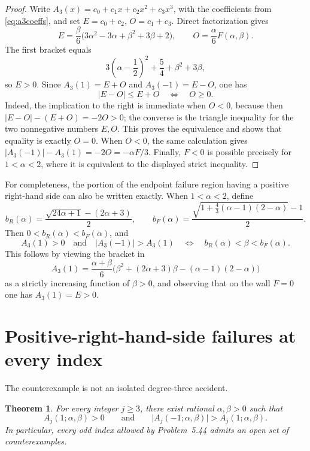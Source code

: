 \documentclass[a4paper]{amsart}
\newtheorem{theorem}{Theorem}[section]
\theoremstyle{remark}
\begin{document}
\begin{proof}
Write \(A_3(x)=c_0+c_1x+c_2x^2+c_3x^3\), with the coefficients from
\eqref{eq:a3coeffs}, and set \(E=c_0+c_2\), \(O=c_1+c_3\).  Direct factorization gives
\[
 E=\frac{\beta}{6}
 \bigl(3\alpha^2-3\alpha+\beta^2+3\beta+2\bigr),
 \qquad
 O=\frac{\alpha}{6}F(\alpha,\beta).
\]
The first bracket equals
\[
 3\left(\alpha-\frac12\right)^2+\frac54+\beta^2+3\beta,
\]
so \(E>0\).  Since \(A_3(1)=E+O\) and \(A_3(-1)=E-O\), one has
\[
 \lvert E-O\rvert\leq E+O \quad\Longleftrightarrow\quad O\geq0.
\]
Indeed, the implication to the right is immediate when \(O<0\), because then
\(\lvert E-O\rvert-(E+O)=-2O>0\); the converse is the triangle inequality for
the two nonnegative numbers \(E,O\).  This proves the equivalence and shows that equality is exactly \(O=0\).  When \(O<0\), the same calculation gives
\(\lvert A_3(-1)\rvert-A_3(1)=-2O=-\alpha F/3\).
Finally, \(F<0\) is possible precisely for \(1<\alpha<2\), where it is equivalent to the displayed strict inequality.
\end{proof}

For completeness, the portion of the endpoint failure region having a positive right-hand side can also be written exactly.  When \(1<\alpha<2\), define
\[
 b_R(\alpha)=\frac{\sqrt{24\alpha+1}-(2\alpha+3)}2,
 \qquad
 b_F(\alpha)=\frac{\sqrt{1+\frac43(\alpha-1)(2-\alpha)}-1}{2}.
\]
Then \(0<b_R(\alpha)<b_F(\alpha)\), and
\[
 A_3(1)>0\quad\text{and}\quad \lvert A_3(-1)\rvert>A_3(1)
 \quad\Longleftrightarrow\quad
 b_R(\alpha)<\beta<b_F(\alpha).
\]
This follows by viewing the bracket in
\[
 A_3(1)=\frac{\alpha+\beta}{6}
 \bigl(\beta^2+(2\alpha+3)\beta-(\alpha-1)(2-\alpha)\bigr)
\]
as a strictly increasing function of \(\beta>0\), and observing that on the wall \(F=0\) one has \(A_3(1)=E>0\).

\section{Positive-right-hand-side failures at every index}

The counterexample is not an isolated degree-three accident.

\begin{theorem}\label{thm:everyindex}
For every integer \(j\geq3\), there exist rational \(\alpha,\beta>0\) such that
\[
 A_j(1;\alpha,\beta)>0
 \qquad\text{and}\qquad
 \lvert A_j(-1;\alpha,\beta)\rvert>A_j(1;\alpha,\beta).
\]
In particular, every odd index allowed by Problem~5.44 admits an open set of counterexamples.
\end{theorem}
\end{document}
